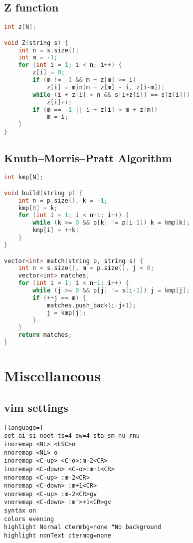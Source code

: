 \documentclass{article}
\begin{document}
\subsection{Z function}
\begin{lstlisting}[language=C++]
int z[N];

void Z(string s) {
	int n = s.size();
	int m = -1;
	for (int i = 1; i < n; i++) {
		z[i] = 0;
		if (m != -1 && m + z[m] >= i)
			z[i] = min(m + z[m] - i, z[i-m]);
		while (i + z[i] < n && s[i+z[i]] == s[z[i]])
			z[i]++;
		if (m == -1 || i + z[i] > m + z[m])
			m = i;
	}
}
\end{lstlisting}
\subsection{Knuth–Morris–Pratt Algorithm}
\begin{lstlisting}[language=C++]
int kmp[N];

void build(string p) {
	int n = p.size(), k = -1;
	kmp[0] = k;
	for (int i = 1; i < n+1; i++) {
		while (k >= 0 && p[k] != p[i-1]) k = kmp[k];
		kmp[i] = ++k;
	}
}

vector<int> match(string p, string s) {
	int n = s.size(), m = p.size(), j = 0;
	vector<int> matches;
	for (int i = 1; i < n+1; i++) {
		while (j >= 0 && p[j] != s[i-1]) j = kmp[j];
		if (++j == m) {
			matches.push_back(i-j+1);
			j = kmp[j];
		}
	}
	return matches;
}
\end{lstlisting}
\section{Miscellaneous}
\subsection{vim settings}
\begin{lstlisting}[language=]
set ai si noet ts=4 sw=4 sta sm nu rnu
inoremap <NL> <ESC>o
nnoremap <NL> o
inoremap <C-up> <C-o>:m-2<CR>
inoremap <C-down> <C-o>:m+1<CR>
nnoremap <C-up> :m-2<CR>
nnoremap <C-down> :m+1<CR>
vnoremap <C-up> :m-2<CR>gv
vnoremap <C-down> :m'>+1<CR>gv
syntax on
colors evening
highlight Normal ctermbg=none "No background
highlight nonText ctermbg=none
\end{lstlisting}

\end{document}
